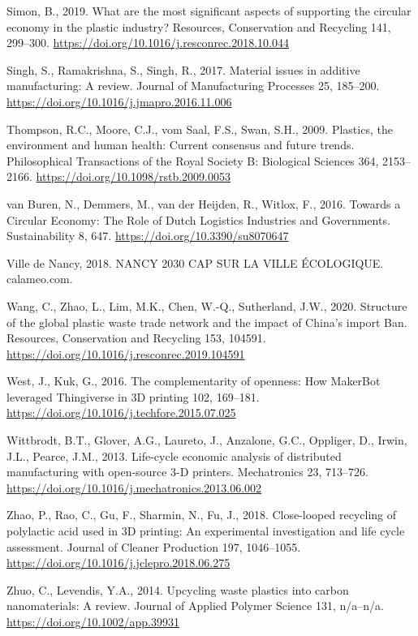 \documentclass[
  11pt,
]{article}
\newlength{\cslhangindent}
\newlength{\cslentryspacingunit} %
\newenvironment{CSLReferences}[2] %
 {%
  \setlength{\parindent}{0pt}
  \ifodd #1
  \let\oldpar\par
  \def\par{\hangindent=\cslhangindent\oldpar}
  \fi
  \setlength{\parskip}{#2\cslentryspacingunit}
 }%
 {}
\begin{document}
\begin{CSLReferences}{1}{0}
\leavevmode{}%
Simon, B., 2019. What are the most significant aspects of supporting the
circular economy in the plastic industry? Resources, Conservation and
Recycling 141, 299--300.
\url{https://doi.org/10.1016/j.resconrec.2018.10.044}

\leavevmode{}%
Singh, S., Ramakrishna, S., Singh, R., 2017. Material issues in additive
manufacturing: {A} review. Journal of Manufacturing Processes 25,
185--200. \url{https://doi.org/10.1016/j.jmapro.2016.11.006}

\leavevmode{}%
Thompson, R.C., Moore, C.J., vom Saal, F.S., Swan, S.H., 2009. Plastics,
the environment and human health: Current consensus and future trends.
Philosophical Transactions of the Royal Society B: Biological Sciences
364, 2153--2166. \url{https://doi.org/10.1098/rstb.2009.0053}

\leavevmode{}%
van Buren, N., Demmers, M., van der Heijden, R., Witlox, F., 2016.
Towards a {Circular Economy}: {The Role} of {Dutch Logistics Industries}
and {Governments}. Sustainability 8, 647.
\url{https://doi.org/10.3390/su8070647}

\leavevmode{}%
Ville de Nancy, 2018. {NANCY 2030 CAP SUR LA VILLE ÉCOLOGIQUE}.
calameo.com.

\leavevmode{}%
Wang, C., Zhao, L., Lim, M.K., Chen, W.-Q., Sutherland, J.W., 2020.
Structure of the global plastic waste trade network and the impact of
{China}'s import {Ban}. Resources, Conservation and Recycling 153,
104591. \url{https://doi.org/10.1016/j.resconrec.2019.104591}

\leavevmode{}%
West, J., Kuk, G., 2016. The complementarity of openness: {How MakerBot}
leveraged {Thingiverse} in {3D} printing 102, 169--181.
\url{https://doi.org/10.1016/j.techfore.2015.07.025}

\leavevmode{}%
Wittbrodt, B.T., Glover, A.G., Laureto, J., Anzalone, G.C., Oppliger,
D., Irwin, J.L., Pearce, J.M., 2013. Life-cycle economic analysis of
distributed manufacturing with open-source 3-{D} printers. Mechatronics
23, 713--726. \url{https://doi.org/10.1016/j.mechatronics.2013.06.002}

\leavevmode{}%
Zhao, P., Rao, C., Gu, F., Sharmin, N., Fu, J., 2018. Close-looped
recycling of polylactic acid used in {3D} printing: {An} experimental
investigation and life cycle assessment. Journal of Cleaner Production
197, 1046--1055. \url{https://doi.org/10.1016/j.jclepro.2018.06.275}

\leavevmode{}%
Zhuo, C., Levendis, Y.A., 2014. Upcycling waste plastics into carbon
nanomaterials: {A} review. Journal of Applied Polymer Science 131,
n/a--n/a. \url{https://doi.org/10.1002/app.39931}

\end{CSLReferences}
\end{document}
